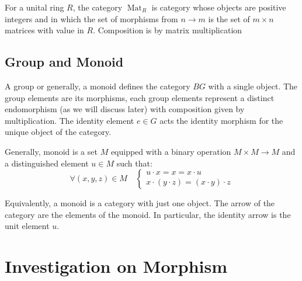 For a unital ring $R$, the category $\operatorname{Mat}_R$ is category whose objects are positive integers and in which the set of morphisms from $n \to m$ is the set of $m \times n$ matrices with value in $R$. Composition is by matrix multiplication
\begin{center}
    {
    }
\end{center}

\subsection{Group and Monoid}
A group or generally, a monoid defines the category $BG$ with a single object. The group elements are its morphisms, each group elements represent a distinct endomorphism (as we will discuss later) with composition given by multiplication. The identity element $e\in G$ acts the identity morphism for the unique object of the category. 

Generally, monoid is a set $M$ equipped with a binary operation $M \times M \longrightarrow M$ and a distinguished element $u\in M$ such that: 
\begin{equation*}
    \forall (x,y,z)\in M\quad \begin{cases}
        u \cdot x = x = x \cdot u \\
        x \cdot ( y \cdot z) = (x \cdot y) \cdot z
    \end{cases}
\end{equation*}

Equivalently, a monoid is a category with just one object. The arrow of the category are the elements of the monoid. In particular, the identity arrow is the unit element $u$. 

\section{Investigation on Morphism}

